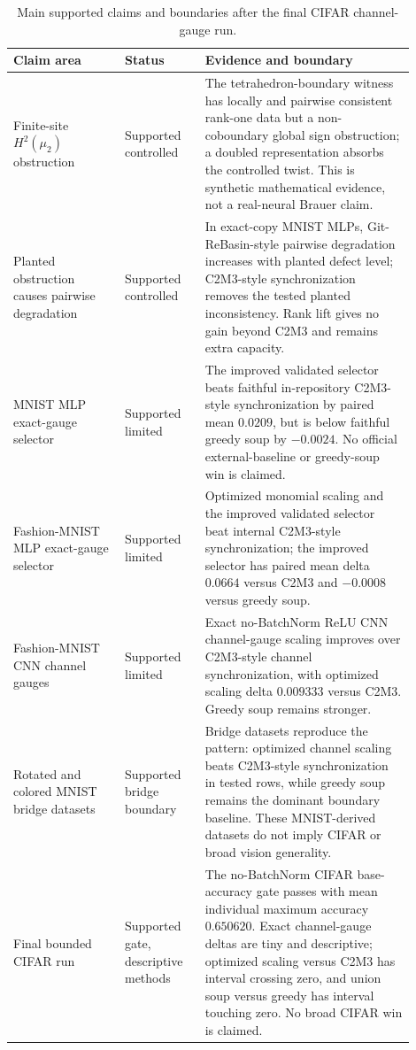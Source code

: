 \begin{table}[t]
\centering
\small
\caption{Main supported claims and boundaries after the final CIFAR channel-gauge run.}
\label{tab:main-claims-after-35791f7}
\begin{tabular}{p{0.25\linewidth}p{0.18\linewidth}p{0.47\linewidth}}
\hline
Claim area & Status & Evidence and boundary \\
\hline
Finite-site \(H^2(\mu_2)\) obstruction & Supported controlled & The tetrahedron-boundary witness has locally and pairwise consistent rank-one data but a non-coboundary global sign obstruction; a doubled representation absorbs the controlled twist. This is synthetic mathematical evidence, not a real-neural Brauer claim. \\
\hline
Planted obstruction causes pairwise degradation & Supported controlled & In exact-copy MNIST MLPs, Git-ReBasin-style pairwise degradation increases with planted defect level; C2M3-style synchronization removes the tested planted inconsistency. Rank lift gives no gain beyond C2M3 and remains extra capacity. \\
\hline
MNIST MLP exact-gauge selector & Supported limited & The improved validated selector beats faithful in-repository C2M3-style synchronization by paired mean \(0.0209\), but is below faithful greedy soup by \(-0.0024\). No official external-baseline or greedy-soup win is claimed. \\
\hline
Fashion-MNIST MLP exact-gauge selector & Supported limited & Optimized monomial scaling and the improved validated selector beat internal C2M3-style synchronization; the improved selector has paired mean delta \(0.0664\) versus C2M3 and \(-0.0008\) versus greedy soup. \\
\hline
Fashion-MNIST CNN channel gauges & Supported limited & Exact no-BatchNorm ReLU CNN channel-gauge scaling improves over C2M3-style channel synchronization, with optimized scaling delta \(0.009333\) versus C2M3. Greedy soup remains stronger. \\
\hline
Rotated and colored MNIST bridge datasets & Supported bridge boundary & Bridge datasets reproduce the pattern: optimized channel scaling beats C2M3-style synchronization in tested rows, while greedy soup remains the dominant boundary baseline. These MNIST-derived datasets do not imply CIFAR or broad vision generality. \\
\hline
Final bounded CIFAR run & Supported gate, descriptive methods & The no-BatchNorm CIFAR base-accuracy gate passes with mean individual maximum accuracy \(0.650620\). Exact channel-gauge deltas are tiny and descriptive; optimized scaling versus C2M3 has interval crossing zero, and union soup versus greedy has interval touching zero. No broad CIFAR win is claimed. \\

\end{tabular}
\end{table}
